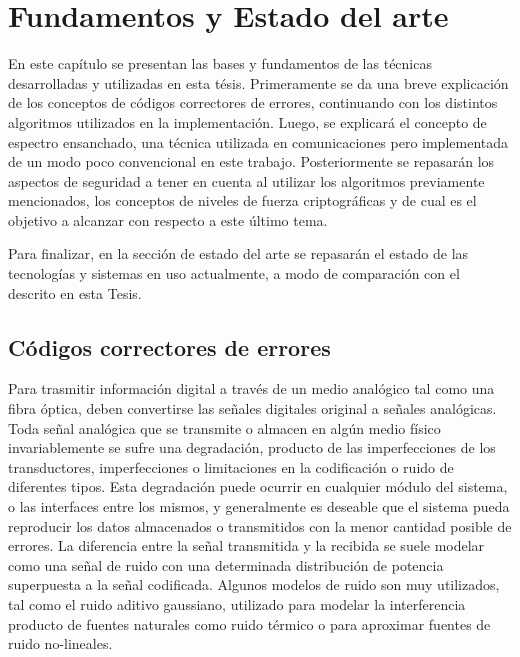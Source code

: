 \chapter{Fundamentos y Estado del arte}

En este capítulo se presentan las bases y fundamentos de las técnicas desarrolladas y utilizadas en esta tésis. 
Primeramente se da una breve explicación de los conceptos de códigos correctores de errores, continuando con los distintos algoritmos utilizados en la implementación. Luego, se explicará el concepto de espectro ensanchado, una técnica utilizada en comunicaciones pero implementada de un modo poco convencional en este trabajo. Posteriormente se repasarán los aspectos de seguridad a tener en cuenta al utilizar los algoritmos previamente mencionados, los conceptos de niveles de fuerza criptográficas y de cual es el objetivo a alcanzar con respecto a este último tema.

Para finalizar, en la sección de estado del arte se repasarán el estado de las tecnologías y sistemas en uso actualmente, a modo de comparación con el descrito en esta Tesis.

\section{Códigos correctores de errores}

Para trasmitir información digital a través de un medio analógico tal como una fibra óptica, deben convertirse las señales digitales original a señales analógicas.
Toda señal analógica que se transmite o almacen en algún medio físico invariablemente se sufre una degradación, producto de las imperfecciones de los transductores, imperfecciones o limitaciones en la codificación o ruido de diferentes tipos. Esta degradación puede ocurrir en cualquier módulo del sistema, o las interfaces entre los mismos, y generalmente es deseable que el sistema pueda reproducir los datos almacenados o transmitidos con la menor cantidad posible de errores. La diferencia entre la señal transmitida y la recibida se suele modelar como una señal de ruido con una determinada distribución de potencia superpuesta a la señal codificada. Algunos modelos de ruido son muy utilizados, tal como el ruido aditivo gaussiano, utilizado para modelar la interferencia producto de fuentes naturales como ruido térmico o para aproximar fuentes de ruido no-lineales.

